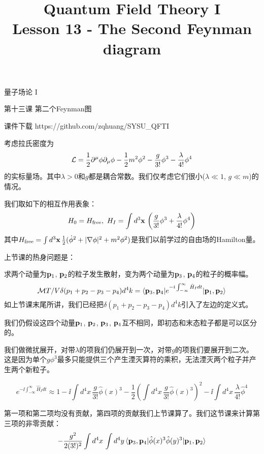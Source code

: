 \documentclass[CJK]{beamer}
\title{Quantum Field Theory I \\ Lesson 13 - The Second Feynman diagram}
\author{}
\date{}
\begin{document}
\begin{frame}
 
\begin{center}
\begin{Large}
\bch
量子场论 I 

{\vskip 0.3in}

第十三课 第二个Feynman图

\ech
\end{Large}
\end{center}

\vskip 0.2in

\bch
课件下载
\ech
https://github.com/zqhuang/SYSU\_QFTI

\end{frame}


\begin{frame} 
\bch
考虑拉氏密度为
$${\mathcal{L}} = \frac{1}{2}\partial^\mu\phi\partial_\mu\phi - \frac{1}{2}m^2\phi^2 - \frac{g}{3!}\phi^3- \frac{\lambda}{4!}\phi^4$$
的实标量场。其中$\lambda>0$和$g$都是耦合常数。我们仅考虑它们很小($\lambda \ll 1$, $g\ll m$)的情况。

我们取如下的相互作用表象：
$$ H_0 = H_{\rm free},\ H_I = \int d^3{\mathbf{x}}\, \left(\frac{g}{3!}\phi^3 + \frac{\lambda}{4!} \phi^4\right)$$
其中$H_{\rm free} = \int d^3{\mathbf{x}}\, \frac{1}{2}(\dot\phi^2 + |\nabla \phi|^2 + m^2\phi^2)$是我们以前学过的自由场的Hamilton量。

\ech
\end{frame}

\begin{frame} 
\bch
上节课的热身问题是：
\skipline

求两个动量为${\mathbf{p}}_1$, ${\mathbf{p}}_2$的粒子发生散射，变为两个动量为${\mathbf{p}}_3$, ${\mathbf{p}}_4$的粒子的概率幅。
$${\mathcal{M}} T/V \delta(p_1+p_2-p_3-p_4)d^4k= \langle {\mathbf{p}}_3, {\mathbf{p}}_4|  e^{-{\dot{\imath}}\int_{-\infty}^\infty \hat{H}_I dt}|{\mathbf{p}}_1,{\mathbf{p}}_2\rangle$$
如上节课末尾所讲，我们已经把$\delta(p_1+p_2-p_3-p_4)d^4k$引入了左边的定义式。
\skipline

我们仍假设这四个动量${\mathbf{p}}_1$, ${\mathbf{p}}_2$, ${\mathbf{p}}_3$, ${\mathbf{p}}_4$互不相同，即初态和末态粒子都是可以区分的。
\ech
\end{frame}

\begin{frame} 
\bch
{\small 
我们做微扰展开，对带$\lambda$的项我们仍展开到一次，对带$g$的项我们要展开到二次。这是因为单个$g\phi^3$最多只能提供三个产生湮灭算符的乘积，无法湮灭两个粒子并产生两个新粒子。

$$e^{-\ii\int_{-\infty}^\infty \hat{H}_I dt}\approx 1-\ii\int d^4x\,\frac{g}{3!}\hat\phi(x)^3 -\frac{1}{2}\left(\int d^4x\,\frac{g}{3!}\hat\phi(x)^3\right)^2- \ii\int d^4x\, \frac{\lambda}{4!}\hat\phi^4 $$

第一项和第二项均没有贡献，第四项的贡献我们上节课算了。我们这节课来计算第三项的非零贡献：
$$ -\frac{g^2}{2(3!)^2} \int d^4x\, \int d^4y\,\langle {\mathbf{p}}_3, {\mathbf{p}}_4|  \hat\phi(x)^3 \hat\phi(y)^3 |{\mathbf{p}}_1,{\mathbf{p}}_2\rangle$$
}
\ech
\end{frame}
\end{document}
